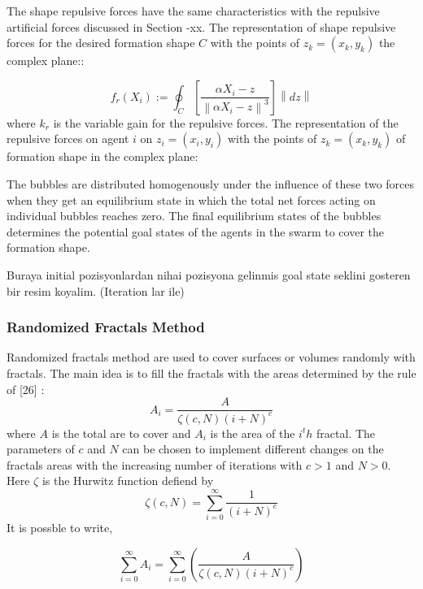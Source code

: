 \documentclass[twoside]{article}
\newcommand{\norm}[1]{\left\lVert#1\right\rVert}
\begin{document}
	The shape repulsive forces have the same characteristics with the repulsive artificial forces discussed in Section -xx. The representation of shape repulsive forces for the desired formation shape $C$ with the points of  $z_k = (x_k,y_k)$ the complex plane::
	
		
			\begin{equation}
			f_r(X_i) := \oint_C \left[\frac{\alpha X_i - z}{\norm{\alpha X_i - z}^3}\right] \norm{dz}
			\end{equation}
			where $k_r$ is the variable gain for the repulsive forces. The representation of the repulsive forces on agent $i$ on $z_i = (x_i, y_i)$ with the points of  $z_k = (x_k,y_k)$ of formation shape in the complex plane:
	
	The bubbles are distributed homogenously under the influence of these two forces when they get an equilibrium state in which the total net forces acting on individual bubbles reaches zero. The final equilibrium states of the bubbles determines the potential goal states of the agents in the swarm to cover the formation shape. 
	
	Buraya initial pozisyonlardan nihai pozisyona gelinmis goal state seklini gosteren bir resim koyalim. (Iteration lar ile)
	
			\subsubsection{Randomized Fractals Method}
Randomized fractals method are used to cover surfaces or volumes randomly with fractals. The main idea is to fill the fractals with the areas determined by the rule of [26] :
\begin{equation}
  A_i = \frac{A}{\zeta(c,N)(i+N)^c}
\end{equation}
	where $A$ is the total are to cover and $A_i$ is the area of the $i^th$ fractal. The parameters of $c$ and $N$ can be chosen to implement different changes on the fractals areas with the increasing number of iterations with $c>1$ and $N>0$. Here  $\zeta$ is the Hurwitz function defiend by
	\begin{equation}
  \zeta(c,N) = \sum_{i=0}^{\infty} \frac{1}{(i+N)^c}
	\end{equation}
	It is possble to write, 
	
		\begin{equation}
		\sum_{i=0}^{\infty}A_i = \sum_{i = 0}^{\infty}\left(\frac{A}{\zeta(c,N)(i+N)^c}\right)
		\end{equation}
	
\end{document}
